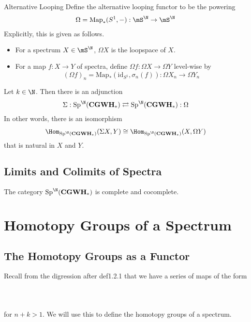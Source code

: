 \documentclass[a4paper]{article}
\begin{document}
\begin{defn}{Alternative Looping}{} Define the alternative looping functor to be the powering $$\Omega=\text{Map}_\ast(S^1,-):\mS^\N\to\mS^\N$$ Explicitly, this is given as follows. 
\begin{itemize}
\item For a spectrum $X\in\mS^\N$, $\Omega X$ is the loopspace of $X$. 
\item For a map $f:X\to Y$ of spectra, define $\Omega f:\Omega X\to\Omega Y$ level-wise by $$(\Omega f)_n=\text{Map}_\ast(\text{id}_{S^1},\sigma_n(f)):\Omega X_n\to\Omega Y_n$$
\end{itemize}
\end{defn}

\begin{prp}{}{} Let $k\in\N$. Then there is an adjunction $$\Sigma:\text{Sp}^\N(\bold{CGWH}_\ast)\rightleftarrows\text{Sp}^\N(\bold{CGWH}_\ast):\Omega$$ In other words, there is an isomorphism $$\Hom_\bold{\text{Sp}^\N(\bold{CGWH}_\ast)}(\Sigma X,Y)\cong\Hom_{\text{Sp}^\N(\bold{CGWH}_\ast)}(X,\Omega Y)$$ that is natural in $X$ and $Y$. 
\end{prp}

\subsection{Limits and Colimits of Spectra}
\begin{prp}{}{} The category $\text{Sp}^\N(\bold{CGWH}_\ast)$ is complete and cocomplete. 
\end{prp}

\pagebreak
\section{Homotopy Groups of a Spectrum}
\subsection{The Homotopy Groups as a Functor}
Recall from the digression after def1.2.1 that we have a series of maps of the form \\~\\
\\~\\
for $n+k>1$. We will use this to define the homotopy groups of a spectrum. 
\end{document}
